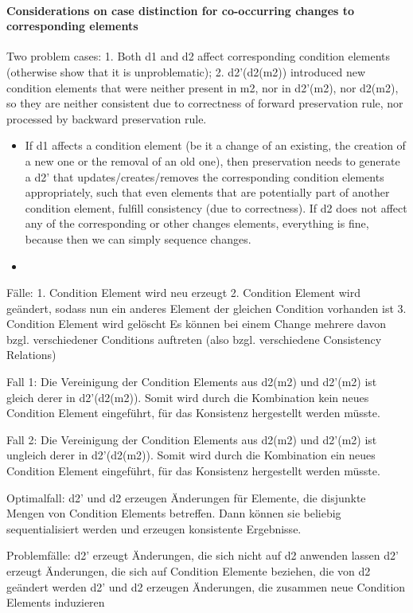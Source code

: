 \paragraph{Considerations on case distinction for co-occurring changes to corresponding elements}
Two problem cases: 
1. Both d1 and d2 affect corresponding condition elements (otherwise show that it is unproblematic); 
2. d2'(d2(m2)) introduced new condition elements that were neither present in m2, nor in d2'(m2), nor d2(m2), so they are neither consistent due to correctness of forward preservation rule, nor processed by backward preservation rule.
\begin{itemize}
    \item If d1 affects a condition element (be it a change of an existing, the creation of a new one or the removal of an old one), then preservation needs to generate a d2' that updates/creates/removes the corresponding condition elements appropriately, such that even elements that are potentially part of another condition element, fulfill consistency (due to correctness). If d2 does not affect any of the corresponding or other changes elements, everything is fine, because then we can simply sequence changes.
    \item 
\end{itemize}
    


Fälle:
1. Condition Element wird neu erzeugt
2. Condition Element wird geändert, sodass nun ein anderes Element der gleichen Condition vorhanden ist
3. Condition Element wird gelöscht
Es können bei einem Change mehrere davon bzgl. verschiedener Conditions auftreten (also bzgl. verschiedene Consistency Relations)


Fall 1: Die Vereinigung der Condition Elements aus d2(m2) und d2'(m2) ist gleich derer in d2'(d2(m2)). Somit wird durch die Kombination kein neues Condition Element eingeführt, für das Konsistenz hergestellt werden müsste.

Fall 2: Die Vereinigung der Condition Elements aus d2(m2) und d2'(m2) ist ungleich derer in d2'(d2(m2)). Somit wird durch die Kombination ein neues Condition Element eingeführt, für das Konsistenz hergestellt werden müsste.



Optimalfall: d2' und d2 erzeugen Änderungen für Elemente, die disjunkte Mengen von Condition Elements betreffen. Dann können sie beliebig sequentialisiert werden und erzeugen konsistente Ergebnisse.

Problemfälle:
d2' erzeugt Änderungen, die sich nicht auf d2 anwenden lassen
d2' erzeugt Änderungen, die sich auf Condition Elemente beziehen, die von d2 geändert werden
d2' und d2 erzeugen Änderungen, die zusammen neue Condition Elements induzieren




